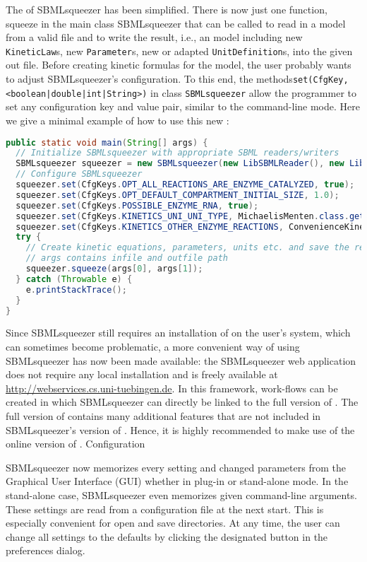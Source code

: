 The \API of SBMLsqueezer has been simplified.
There is now just one function, squeeze in the main class SBMLsqueezer that can
be called to read in a model from a valid \SBML file and to write the result,
i.e., an \SBML model including new \texttt{KineticLaw}s, new \texttt{Parameter}s, new or adapted
\texttt{UnitDefinition}s, into the given out file. Before creating kinetic formulas for
the model, the user probably wants to adjust SBMLsqueezer's configuration.
To this end, the methods\texttt{set(CfgKey, <boolean|double|int|String>)} in class
\texttt{SBMLsqueezer} allow the programmer to set any configuration key and value pair,
similar to the command-line mode. Here we give a minimal example of how to use
this new \API:
\begin{lstlisting}[language=Java, caption={Usage of SBMLsqueezer 1.3 via its \acs{API}\label{lst:1.3APIUsage}}]
public static void main(String[] args) {
  // Initialize SBMLsqueezer with appropriate SBML readers/writers
  SBMLsqueezer squeezer = new SBMLsqueezer(new LibSBMLReader(), new LibSBMLWriter());
  // Configure SBMLsqueezer
  squeezer.set(CfgKeys.OPT_ALL_REACTIONS_ARE_ENZYME_CATALYZED, true);
  squeezer.set(CfgKeys.OPT_DEFAULT_COMPARTMENT_INITIAL_SIZE, 1.0);
  squeezer.set(CfgKeys.POSSIBLE_ENZYME_RNA, true);
  squeezer.set(CfgKeys.KINETICS_UNI_UNI_TYPE, MichaelisMenten.class.getName());
  squeezer.set(CfgKeys.KINETICS_OTHER_ENZYME_REACTIONS, ConvenienceKinetics.class.getName());
  try {
    // Create kinetic equations, parameters, units etc. and save the result
    // args contains infile and outfile path
    squeezer.squeeze(args[0], args[1]);
  } catch (Throwable e) {
    e.printStackTrace();
  }
}
\end{lstlisting}
Since SBMLsqueezer still requires an installation of \libSBML on the user's
system, which can sometimes become problematic, a more convenient way of using
SBMLsqueezer has now been made available: the SBMLsqueezer web application does
not require any local installation and is freely available at
\url{http://webservices.cs.uni-tuebingen.de}. In this framework, work-flows can
be created in which SBMLsqueezer can directly be linked to the full version of
\SBMLLaTeX. The full version of \SBMLLaTeX contains many additional features
that are not included in SBMLsqueezer's version of \SBMLLaTeX. Hence, it is
highly recommended to make use of the online version of \SBMLLaTeX.
Configuration

SBMLsqueezer now memorizes every setting and changed parameters from the
Graphical User Interface (GUI) whether in \CellDesigner plug-in or stand-alone
mode. In the stand-alone case, SBMLsqueezer even memorizes given command-line
arguments. These settings are read from a configuration file at the next start.
This is especially convenient for open and save directories. At any time, the
user can change all settings to the defaults by clicking the designated button
in the preferences dialog.

